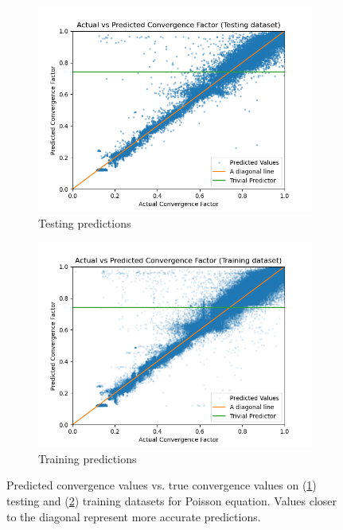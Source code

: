 \documentclass[review]{siamart190516}
\begin{document}
\begin{figure}[h]
  \centering
  \begin{subfigure}{.48\textwidth}
    \includegraphics[width=\textwidth]{figs/poisson_conv_test_pred.png}
    \caption{Testing predictions}
    \label{subfig:poisson_conv_test}
  \end{subfigure}
  \begin{subfigure}{.48\textwidth}
    \includegraphics[width=\textwidth]{figs/poisson_conv_train_pred.png}
    \caption{Training predictions}
    \label{subfig:poisson_conv_train}
  \end{subfigure}
  \caption{Predicted convergence values vs. true convergence values on (\ref{subfig:poisson_conv_test}) testing and (\ref{subfig:poisson_conv_train}) training datasets for Poisson equation. Values closer to the diagonal represent more accurate predictions. }
  \label{fig:poisson_conv_pred}
\end{figure}
\end{document}
